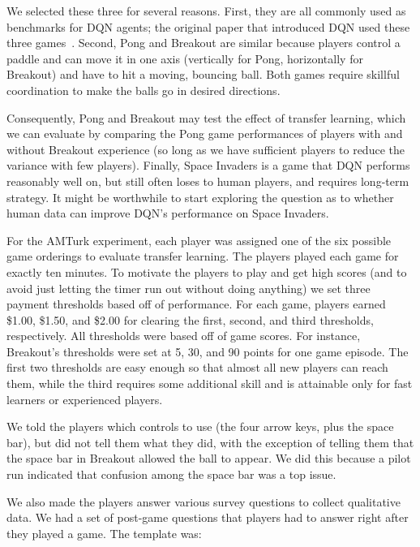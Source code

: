 \documentclass[letterpaper, 10 pt, conference]{ieeeconf}  %
\begin{document}
We selected these three for several reasons. First, they are all commonly used as benchmarks
for DQN agents; the original paper that introduced DQN used these three
games~\cite{mnih-atari-2013}. Second, Pong and Breakout are similar because players control a
paddle and can move it in one axis (vertically for Pong, horizontally for Breakout) and have to
hit a moving, bouncing ball. Both games require skillful coordination to make the balls go in
desired directions.

Consequently, Pong and Breakout may test the effect of transfer learning, which we can evaluate by
comparing the Pong game performances of players with and without Breakout experience (so long as we
have sufficient players to reduce the variance with few players). Finally, Space Invaders is a game
that DQN performs reasonably well on, but still often loses to human players, and requires long-term
strategy. It might be worthwhile to start exploring the question as to whether human data can
improve DQN's performance on Space Invaders.

For the AMTurk experiment, each player was assigned one of the six possible game orderings to 
evaluate transfer learning. The players played each game for exactly ten minutes. To motivate
the players to play and get high scores (and to avoid just letting the timer run out without doing
anything) we set three payment thresholds based off of performance. For each game, players earned
\$1.00, \$1.50, and \$2.00 for clearing the first, second, and third thresholds, respectively. All
thresholds were based off of game scores. For instance, Breakout's thresholds were set at 5, 30, and
90 points for one game episode. The first two thresholds are easy enough so that almost all new
players can reach them, while the third requires some additional skill and is attainable only for
fast learners or experienced players.

We told the players which controls to use (the four arrow keys, plus the space bar), but did not
tell them what they did, with the exception of telling them that the space bar in Breakout allowed
the ball to appear. We did this because a pilot run indicated that confusion among the space bar was
a top issue.

We also made the players answer various survey questions to collect qualitative data. We had a set
of post-game questions that players had to answer right after they played a game. The template was:
\end{document}
